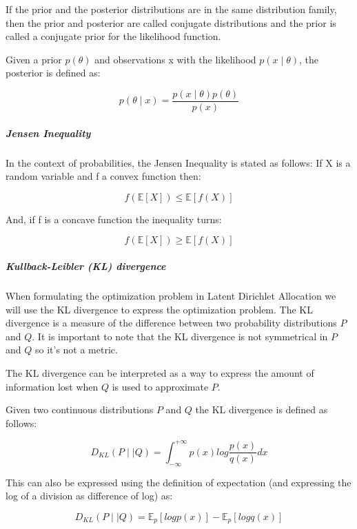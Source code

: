 \documentclass[12pt]{report}
\begin{document}
If the prior and the posterior distributions are in the same distribution
family, then the prior and posterior are called conjugate distributions and the
prior is called a conjugate prior for the likelihood function.

Given a prior $p(\theta)$ and observations x with the likelihood 
$p(x \mid \theta)$, the posterior is defined as:

\begin{equation}
p(\theta \mid x) = \frac{p(x \mid \theta) p(\theta)}{p(x)}
\end{equation}


\subparagraph{Jensen Inequality}

In the context of probabilities, the Jensen Inequality is stated as follows: 
If X is a random variable and f a convex function then:

\begin{equation}
f(\mathbb{E}[X]) \leq \mathbb{E}[f(X)]
\end{equation}

And, if f is a concave function the inequality turns:

\begin{equation}
f(\mathbb{E}[X]) \geq \mathbb{E}[f(X)]
\end{equation}


\subparagraph{Kullback-Leibler (KL) divergence}

When formulating the optimization problem in Latent Dirichlet Allocation we 
will use the KL divergence to express the optimization problem. The KL divergence 
is a measure of the difference between two probability distributions $P$ and $Q$. 
It is important to note
that the KL divergence is not symmetrical in $P$ and $Q$ so it's not a metric.

The KL divergence can be interpreted as a way to express the amount of 
information lost when $Q$ is used to approximate $P$.

Given two continuous distributions $P$ and $Q$ the KL divergence is defined as follows:

\begin{equation}
D_{KL}(P \mid \mid Q) = \int_{-\infty}^{+\infty} p(x) log\frac{p(x)}{q(x)}dx
\end{equation}

This can also be expressed using the definition of expectation (and expressing the 
log of a division as difference of log) as:

\begin{equation}
D_{KL}(P \mid \mid Q) = \mathbb{E}_{p}[log p(x)] - \mathbb{E}_{p}[log q(x)]
\end{equation}
\end{document}

